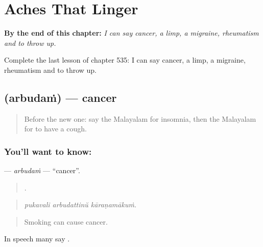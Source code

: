 
\chapter{Aches That Linger}
\label{ch:ml-aches-that-linger}

\begin{chapteropening}
\textbf{By the end of this chapter:} \emph{I can say cancer, a limp, a migraine, rheumatism and to throw up.}

Complete the last lesson of chapter 535: I can say cancer, a limp, a migraine, rheumatism and to throw up.
\end{chapteropening}

\section[\texorpdfstring{\ml{അർബുദം} (arbudaṁ)}{അർബുദം (arbudaṁ)}]{ (arbudaṁ) — cancer}

\label{lesson:ML-C535-arbudam}



\begin{quote}
Before the new one: say the Malayalam for insomnia, then the Malayalam for to have a cough.
\end{quote}

\subsection*{You'll want to know: }
\textbf{} — \emph{arbudaṁ} — \textquotedblleft{}cancer\textquotedblright{}.

\begin{quote}
  .
\end{quote}

\begin{quote}
\emph{pukavali arbudattinŭ kāraṇamākuṁ.}
\end{quote}

\begin{quote}
Smoking can cause cancer.
\end{quote}

In speech many say .

